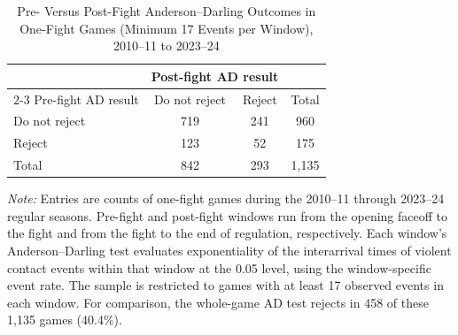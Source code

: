\begin{table}[htbp]
\centering
\caption{Pre- Versus Post-Fight Anderson--Darling Outcomes in One-Fight Games (Minimum 17 Events per Window), 2010--11 to 2023--24}
\label{tab:one_fight_AD_rejection_min_17_20102011_20232024}
\small
\renewcommand{\arraystretch}{1.15}
\setlength{\tabcolsep}{6pt}

\begin{tabular*}{0.78\textwidth}{@{\extracolsep{\fill}}lccc}
\toprule
 & \multicolumn{2}{c}{Post-fight AD result} & \\
\cmidrule(lr){2-3}
Pre-fight AD result & Do not reject & Reject & Total \\
\midrule
Do not reject & 719 & 241 & 960 \\
Reject & 123 & 52 & 175 \\
\midrule
Total & 842 & 293 & 1,135 \\
\bottomrule
\end{tabular*}

\vspace{0.4em}
\parbox{0.78\textwidth}{
\footnotesize
\textit{Note:} Entries are counts of one-fight games during the 2010--11 through 2023--24 regular seasons. Pre-fight and post-fight windows run from the opening faceoff to the fight and from the fight to the end of regulation, respectively. Each window's Anderson--Darling test evaluates exponentiality of the interarrival times of violent contact events within that window at the 0.05 level, using the window-specific event rate. The sample is restricted to games with at least 17 observed events in each window. For comparison, the whole-game AD test rejects in 458 of these 1,135 games (40.4\%).
}
\end{table}
